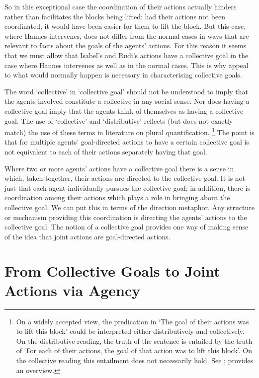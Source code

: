 \documentclass[12pt,a4paper]{extarticle}
\begin{document}
So in this exceptional case the coordination of their actions actually hinders rather than facilitates the blocks being lifted:
had their actions not been coordinated, it would have been easier for them to lift the block.
But this case, where Hannes intervenes, does not differ from the normal cases in ways that are relevant to facts about the goals of the agents' actions.  
For this reason it seems that we must allow that Isabel's and Rudi's actions have a collective goal in the case where Hannes intervenes as well as in the normal cases.
This is why appeal to what would normally happen is  necessary in characterising collective goals.

The word `collective' in `collective goal' should not be understood to imply that the agents  involved constitute a collective in any social sense.  Nor does having a collective goal imply that the agents think of themselves as having a collective goal.  The use of `collective' and `distributive' reflects  (but does not exactly match) the use of these terms in literature on plural quantification.%
%
\footnote{
On a widely accepted view,  the predication in `The goal of their actions was to lift this block' could be interpreted  either distributively and collectively.  On the distributive reading, the truth of the sentence is entailed by the truth of `For each of their actions, the goal of that action was to lift this block'.  On the collective reading this entailment does not necessarily hold.
See  
	\citet[][p.\ 322]{oliver_modest_2006};
	\citet{Linnebo:2005ig} provides an overview.  
}
%
The point is that for multiple agents' goal-directed actions to have a certain collective goal is not equivalent to each of their actions separately having that goal.


Where two or more agents' actions have a collective goal there is a sense in which, taken together, their actions are directed to the collective goal.  
It is not just that each agent individually pursues the collective goal; in addition, there is coordination among their actions which plays a role in bringing about the collective goal.  
We can put this in terms of the direction metaphor.  
Any structure or mechanism providing this coordination is directing the agents' actions to the collective goal.  
The notion of a collective goal provides one way of making sense of the idea that joint actions are goal-directed actions.

\label{end_section_collective_goals}


\section{From Collective Goals to Joint Actions via Agency}	
	\label{section_from_collective_goals}
\end{document}

